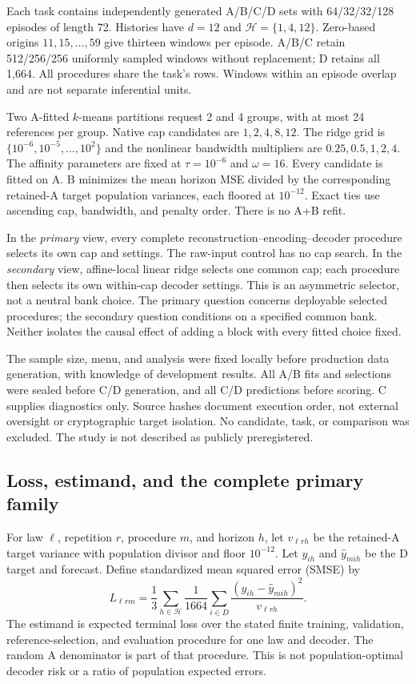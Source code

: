 Each task contains independently generated A/B/C/D sets with 64/32/32/128 episodes of length 72. Histories have $d=12$ and $\mathcal H=\{1,4,12\}$. Zero-based origins $11,15,\ldots,59$ give thirteen windows per episode. A/B/C retain 512/256/256 uniformly sampled windows without replacement; D retains all 1,664. All procedures share the task's rows. Windows within an episode overlap and are not separate inferential units.

Two A-fitted $k$-means partitions request 2 and 4 groups, with at most 24 references per group. Native cap candidates are $1,2,4,8,12$. The ridge grid is $\{10^{-6},10^{-5},\ldots,10^2\}$ and the nonlinear bandwidth multipliers are $0.25,0.5,1,2,4$. The affinity parameters are fixed at $\tau=10^{-6}$ and $\omega=16$. Every candidate is fitted on A. B minimizes the mean horizon MSE divided by the corresponding retained-A target population variances, each floored at $10^{-12}$. Exact ties use ascending cap, bandwidth, and penalty order. There is no A+B refit.

In the \emph{primary} view, every complete reconstruction--encoding--decoder procedure selects its own cap and settings. The raw-input control has no cap search. In the \emph{secondary} view, affine-local linear ridge selects one common cap; each procedure then selects its own within-cap decoder settings. This is an asymmetric selector, not a neutral bank choice. The primary question concerns deployable selected procedures; the secondary question conditions on a specified common bank. Neither isolates the causal effect of adding a block with every fitted choice fixed.

The sample size, menu, and analysis were fixed locally before production data generation, with knowledge of development results. All A/B fits and selections were sealed before C/D generation, and all C/D predictions before scoring. C supplies diagnostics only. Source hashes document execution order, not external oversight or cryptographic target isolation. No candidate, task, or comparison was excluded. The study is not described as publicly preregistered.

\subsection{Loss, estimand, and the complete primary family}
For law $\ell$, repetition $r$, procedure $m$, and horizon $h$, let $v_{\ell rh}$ be the retained-A target variance with population divisor and floor $10^{-12}$. Let $y_{ih}$ and $\widehat y_{mih}$ be the D target and forecast. Define standardized mean squared error (SMSE) by
\begin{equation}
 L_{\ell rm}=\frac13\sum_{h\in\mathcal H}
 \frac{1}{1664}\sum_{i\in D}\frac{(y_{ih}-\widehat y_{mih})^2}{v_{\ell rh}}.
 \label{eq:loss}
\end{equation}
The estimand is expected terminal loss over the stated finite training, validation, reference-selection, and evaluation procedure for one law and decoder. The random A denominator is part of that procedure. This is not population-optimal decoder risk or a ratio of population expected errors.

